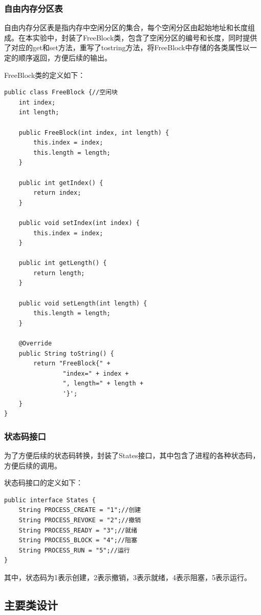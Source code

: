 \documentclass[UTF8,12pt]{article}
\begin{document}
\subsubsection{自由内存分区表}
自由内存分区表是指内存中空闲分区的集合，每个空闲分区由起始地址和长度组成。在本实验中，封装了FreeBlock类，包含了空闲分区的编号和长度，同时提供了对应的get和set方法，重写了tostring方法，将FreeBlock中存储的各类属性以一定的顺序返回，方便后续的输出。

FreeBlock类的定义如下：
\begin{lstlisting}[title=FreeBlock类定义,frame=shadowbox]
public class FreeBlock {//空闲块
    int index;
    int length;

    public FreeBlock(int index, int length) {
        this.index = index;
        this.length = length;
    }

    public int getIndex() {
        return index;
    }

    public void setIndex(int index) {
        this.index = index;
    }

    public int getLength() {
        return length;
    }

    public void setLength(int length) {
        this.length = length;
    }

    @Override
    public String toString() {
        return "FreeBlock{" +
                "index=" + index +
                ", length=" + length +
                '}';
    }
}
\end{lstlisting}

\subsubsection{状态码接口}
为了方便后续的状态码转换，封装了States接口，其中包含了进程的各种状态码，方便后续的调用。

状态码接口的定义如下：
\begin{lstlisting}[title=状态码接口定义,frame=shadowbox]
public interface States {
    String PROCESS_CREATE = "1";//创建
    String PROCESS_REVOKE = "2";//撤销
    String PROCESS_READY = "3";//就绪
    String PROCESS_BLOCK = "4";//阻塞
    String PROCESS_RUN = "5";//运行
}
\end{lstlisting}

其中，状态码为1表示创建，2表示撤销，3表示就绪，4表示阻塞，5表示运行。

\subsection{主要类设计}
\end{document}
